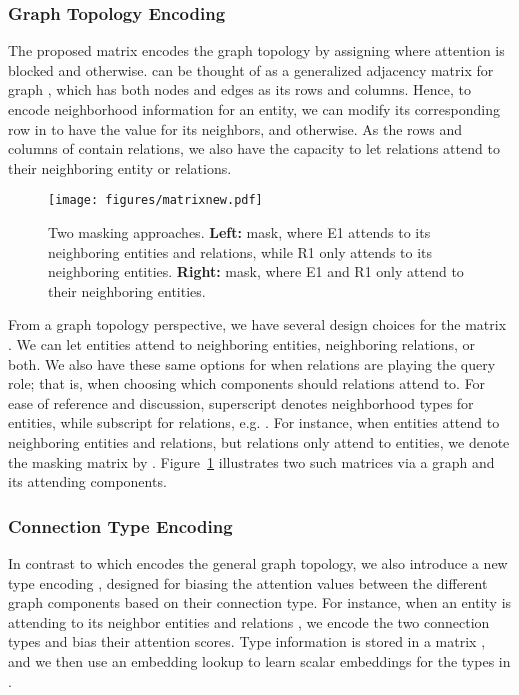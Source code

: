 \documentclass[11pt]{article}
\begin{document}
\subsubsection{Graph Topology Encoding}
The proposed matrix  encodes the graph topology by assigning  where attention is blocked and  otherwise.  can be thought of as a generalized adjacency matrix for graph , which has both nodes and edges as its rows and columns. Hence, to encode neighborhood information for an entity, we can modify its corresponding row in  to have the value  for its neighbors, and  otherwise. As the rows and columns of  contain relations, we also have the capacity to let relations attend to their neighboring entity or relations.
\begin{figure}[t!]
\centering
\texttt{[image: figures/matrixnew.pdf]}
\caption{Two masking approaches. \textbf{Left:}  mask, where E1 attends to its neighboring entities and relations, while R1 only attends to its neighboring entities. \textbf{Right:}  mask, where E1 and R1 only attend to their neighboring entities.}
\label{fig:matrix}
\end{figure}


From a graph topology perspective, we have several design choices for the matrix . We can let entities attend to neighboring entities, neighboring relations, or both. We also have these same options for when relations are playing the query role; that is, when choosing which components should relations attend to. For ease of reference and discussion, superscript denotes neighborhood types for entities, while subscript for relations, e.g. .
For instance, when entities attend to neighboring entities and relations, but relations only attend to entities, we denote the masking matrix by . Figure~\ref{fig:matrix} illustrates two such matrices via a graph and its attending components.




\subsubsection{Connection Type Encoding}
In contrast to  which encodes the general graph topology, we also introduce a new type encoding , designed for biasing the attention values between the different graph components based on their connection type.
For instance, when an entity  is attending to its neighbor entities  and relations , we encode the two connection types and bias their attention scores. 
Type information is stored in a matrix , and we then use an embedding lookup  to learn scalar embeddings for the types in .
\end{document}
